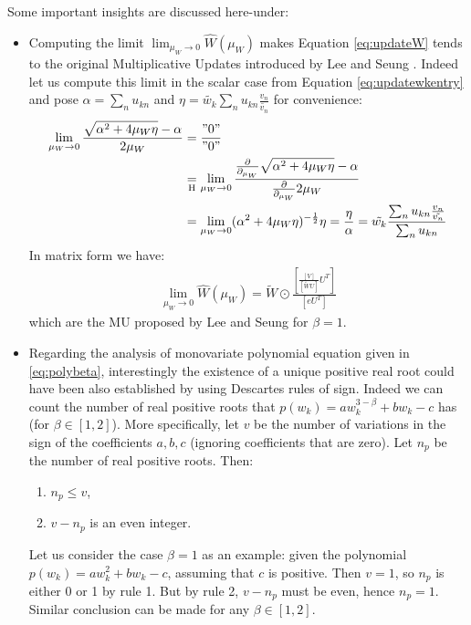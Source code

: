 \documentclass[a4paper, 11pt]{article}
\begin{document}
Some important insights are discussed here-under:
\begin{itemize}
    \item Computing the limit $\lim_{\mu_W \to 0} \hat{W}(\mu_W)$ makes Equation \eqref{eq:updateW} tends to the original Multiplicative Updates introduced by Lee and Seung \cite{Lee1999Learning}. Indeed let us compute this limit in the scalar case from Equation \eqref{eq:updatewkentry} and pose $\alpha=\sum_n u_{kn}$ and $\eta=\tilde{w_{k}}\sum_n u_{kn}\frac{v_n}{\tilde{v_{n}}}$ for convenience:
    \begin{equation}
        \begin{aligned}
           \lim_{\mu_W \to 0} \frac{\sqrt{\alpha^2+4\mu_W \eta}-\alpha}{2 \mu_W} & = \frac{"0"}{"0"} \\
           & \underset{\text{H}}{=}\lim_{\mu_W \to 0} \frac{\frac{\partial}{\partial_{\mu_W}} \sqrt{\alpha^2+4\mu_W \eta}-\alpha}{\frac{\partial}{\partial_{\mu_W}}2 \mu_W}\\
           & = \lim_{\mu_W \to 0} (\alpha^2+4\mu_W\eta)^{-\frac{1}{2}} \eta = \frac{\eta}{\alpha}=\tilde{w_{k}}  \frac{\sum_n u_{kn}\frac{v_n}{\tilde{v_{n}}}}{\sum_n u_{kn}}
        \end{aligned}
    \end{equation}
    In matrix form we have:
    \begin{equation}
        \begin{aligned}
           \lim_{\mu_W \to 0} \hat{W}(\mu_W) = \tilde{W} \odot \frac{\left[ \frac{\left[ V \right]}{\left[ \tilde{W}U \right]} U^T \right]}{\left[ eU^T \right]}
        \end{aligned}
    \end{equation}
    which are the MU proposed by Lee and Seung for $\beta=1$.
    \item Regarding the analysis of monovariate polynomial equation given in \eqref{eq:polybeta}, interestingly the existence of a unique positive real root could have been also established by using Descartes rules of sign. Indeed we can count the number of real positive roots that $p(w_k)=a w_k^{3-\beta} + b w_k - c$ has (for $\beta \in [1,2] $). More specifically, let $v$ be the number of variations in the sign of the coefficients $a,b,c$ (ignoring coefficients that are zero). Let $n_p$ be the number of real positive roots. Then:
    \begin{enumerate}
        \item $n_p \leq v$,
        \item $v-n_p$ is an even integer.
    \end{enumerate}
     Let us consider the case $\beta=1$ as an example: given the polynomial $p(w_k)=a w_k^{2} + b w_k - c$, assuming that $c$ is positive. Then $v=1$, so $n_p$ is either 0 or 1 by rule 1. But by rule 2, $v-n_p$ must be even, hence $n_p=1$. Similar conclusion can be made for any $\beta \in [1,2] $.

\end{itemize}
\end{document}
